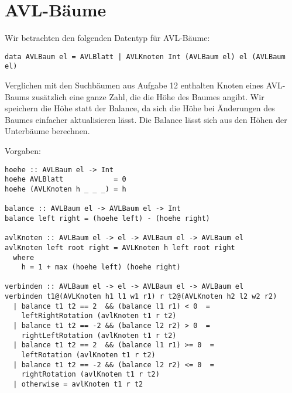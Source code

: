 \documentclass[
  10pt,                   %
  DIV12,
  german,                 %
  oneside,                %
  parskip=half,           %
  headings=normal,        %
  captions=tableheading,  %
]{scrartcl}
\begin{document}
\section{AVL-Bäume}
Wir betrachten den folgenden Datentyp für AVL-Bäume:
\begin{center}
\lstinline!data AVLBaum el = AVLBlatt | AVLKnoten Int (AVLBaum el) el (AVLBaum el)!
\end{center}
Verglichen mit den Suchbäumen aus Aufgabe 12 enthalten Knoten eines AVL-Baums zusätzlich eine ganze Zahl, die die Höhe des Baumes angibt. Wir speichern die Höhe statt der Balance, da sich die Höhe bei Änderungen des Baumes einfacher aktualisieren lässt. Die Balance lässt sich aus den Höhen der Unterbäume berechnen.

Vorgaben:

\begin{lstlisting}
hoehe :: AVLBaum el -> Int
hoehe AVLBlatt            = 0
hoehe (AVLKnoten h _ _ _) = h

balance :: AVLBaum el -> AVLBaum el -> Int
balance left right = (hoehe left) - (hoehe right)

avlKnoten :: AVLBaum el -> el -> AVLBaum el -> AVLBaum el
avlKnoten left root right = AVLKnoten h left root right
  where
    h = 1 + max (hoehe left) (hoehe right)
    
verbinden :: AVLBaum el -> el -> AVLBaum el -> AVLBaum el
verbinden t1@(AVLKnoten h1 l1 w1 r1) r t2@(AVLKnoten h2 l2 w2 r2) 
  | balance t1 t2 == 2  && (balance l1 r1) < 0  = 
    leftRightRotation (avlKnoten t1 r t2)
  | balance t1 t2 == -2 && (balance l2 r2) > 0  = 
    rightLeftRotation (avlKnoten t1 r t2)
  | balance t1 t2 == 2  && (balance l1 r1) >= 0  = 
    leftRotation (avlKnoten t1 r t2)
  | balance t1 t2 == -2 && (balance l2 r2) <= 0  = 
    rightRotation (avlKnoten t1 r t2)
  | otherwise = avlKnoten t1 r t2
\end{lstlisting}
\end{document}

